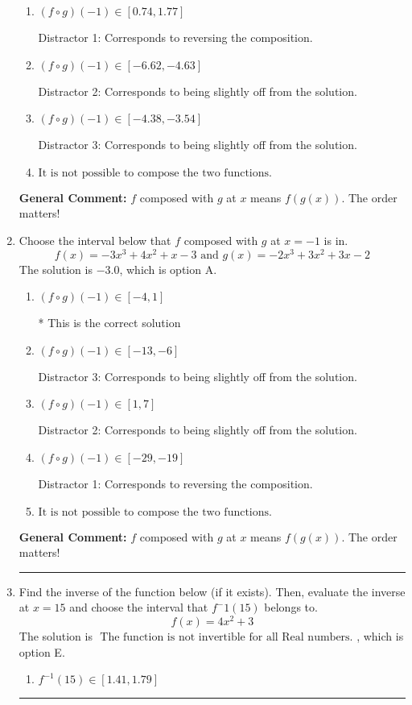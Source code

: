 \documentclass{extbook}[14pt]
\newcommand{\litem}[1]{\item #1

\rule{\textwidth}{0.4pt}}
\begin{document}
\begin{enumerate}
{\begin{enumerate}[label=\Alph*.]
* This is the correct solution
\item \( (f \circ g)(-1) \in [0.74, 1.77] \)

 Distractor 1: Corresponds to reversing the composition.
\item \( (f \circ g)(-1) \in [-6.62, -4.63] \)

 Distractor 2: Corresponds to being slightly off from the solution.
\item \( (f \circ g)(-1) \in [-4.38, -3.54] \)

 Distractor 3: Corresponds to being slightly off from the solution.
\item \( \text{It is not possible to compose the two functions.} \)


\end{enumerate}

\textbf{General Comment:} $f$ composed with $g$ at $x$ means $f(g(x))$. The order matters!
}
\litem{
Choose the interval below that $f$ composed with $g$ at $x=-1$ is in.
\[ f(x) = -3x^{3} +4 x^{2} +x -3 \text{ and } g(x) = -2x^{3} +3 x^{2} +3 x -2 \]The solution is \( -3.0 \), which is option A.\begin{enumerate}[label=\Alph*.]
\item \( (f \circ g)(-1) \in [-4, 1] \)

* This is the correct solution
\item \( (f \circ g)(-1) \in [-13, -6] \)

 Distractor 3: Corresponds to being slightly off from the solution.
\item \( (f \circ g)(-1) \in [1, 7] \)

 Distractor 2: Corresponds to being slightly off from the solution.
\item \( (f \circ g)(-1) \in [-29, -19] \)

 Distractor 1: Corresponds to reversing the composition.
\item \( \text{It is not possible to compose the two functions.} \)


\end{enumerate}

\textbf{General Comment:} $f$ composed with $g$ at $x$ means $f(g(x))$. The order matters!
}
\litem{
Find the inverse of the function below (if it exists). Then, evaluate the inverse at $x = 15$ and choose the interval that $f^-1(15)$ belongs to.
\[ f(x) = 4 x^2 + 3 \]The solution is \( \text{ The function is not invertible for all Real numbers. } \), which is option E.\begin{enumerate}[label=\Alph*.]
\item \( f^{-1}(15) \in [1.41, 1.79] \)


\end{enumerate}}
\end{enumerate}
\end{document}
